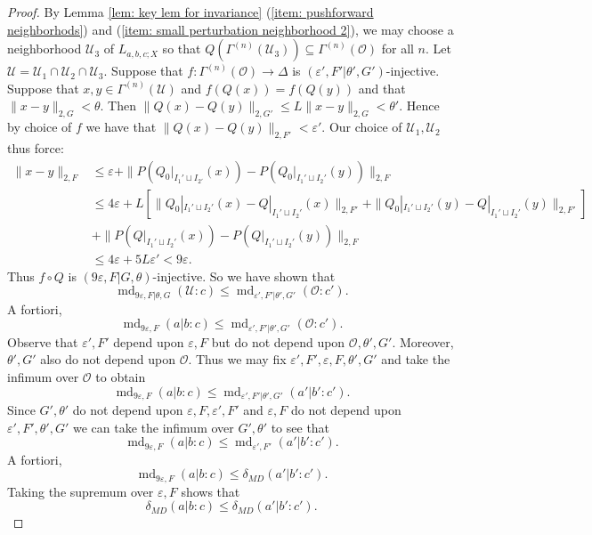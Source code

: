 \documentclass[10pt,a4paper]{amsart}
\DeclareMathOperator{\md}{md}
\begin{document}
\begin{proof}
By Lemma \ref{lem: key lem for invariance} (\ref{item: pushforward neighborhods}) and  (\ref{item: small perturbation neighborhood 2}), we may choose a neighborhood $\mathcal{U}_{3}$ of $L_{a,b,c;X}$ so that $Q(\Gamma^{(n)}(\mathcal{U}_{3}))\subseteq \Gamma^{(n)}(\mathcal{O})$ for all $n$. Let $\mathcal{U}=\mathcal{U}_{1}\cap \mathcal{U}_{2}\cap \mathcal{U}_{3}$. 
Suppose that $f\colon \Gamma^{(n)}(\mathcal{O})\to \Delta$ is $(\varepsilon',F'|\theta',G')$-injective. 
Suppose that $x,y\in \Gamma^{(n)}(\mathcal{U})$ and $f(Q(x))=f(Q(y))$ and that $\|x-y\|_{2,G}<\theta$. Then $\|Q(x)-Q(y)\|_{2,G'}\leq L\|x-y\|_{2,G}<\theta'$. Hence by choice of $f$ we have that $\|Q(x)-Q(y)\|_{2,F'}<\varepsilon'$. Our choice of $\mathcal{U}_{1},\mathcal{U}_{2}$ thus force:
\begin{align*}
\|x-y\|_{2,F}&\leq \varepsilon+\|P(Q_{0}|_{I_{1}'\sqcup I_{2'}}(x))-P(Q_{0}|_{I_{1}'\sqcup I_{2}'}(y))\|_{2,F}\\
&\leq 4\varepsilon+L\left[\|Q_{0}|_{I_{1}'\sqcup I_{2}'}(x)-Q|_{I_{1}'\sqcup I_{2}'}(x)\|_{2,F'}+\|Q_{0}|_{I_{1}'\sqcup I_{2}'}(y)-Q|_{I_{1}'\sqcup I_{2}'}(y)\|_{2,F'} \right]\\
&+\|P(Q|_{I_{1}'\sqcup I_{2}'}(x))-P(Q|_{I_{1}'\sqcup I_{2}'}(y))\|_{2,F}\\
&\leq 4\varepsilon+5L\varepsilon'<9\varepsilon.    
\end{align*}
Thus $f\circ Q$ is $(9\varepsilon,F|G,\theta)$-injective. So we have shown that 
\[\md_{9\varepsilon,F|\theta,G}(\mathcal{U}:c)\leq \md_{\varepsilon',F'|\theta',G'}(\mathcal{O}:c').\]
A fortiori,
\[\md_{9\varepsilon,F}(a|b:c)\leq \md_{\varepsilon',F'|\theta',G'}(\mathcal{O}:c').\]
Observe that $\varepsilon',F'$ depend upon $\varepsilon,F$ but do not depend upon $\mathcal{O},\theta',G'$. Moreover, $\theta',G'$ also do not depend upon $\mathcal{O}$. Thus we may fix $\varepsilon',F',\varepsilon,F,\theta',G'$ and take the infimum over $\mathcal{O}$ to obtain
\[\md_{9\varepsilon,F}(a|b:c)\leq \md_{\varepsilon',F'|\theta',G'}(a'|b':c').\]
Since $G',\theta'$ do not depend upon $\varepsilon,F,\varepsilon',F'$ and $\varepsilon,F$ do not depend upon $\varepsilon',F',\theta',G'$ we can take the infimum over $G',\theta'$ to see  that
\[\md_{9\varepsilon,F}(a|b:c)\leq \md_{\varepsilon',F'}(a'|b':c').\]
A fortiori,
\[\md_{9\varepsilon,F}(a|b:c)\leq \delta_{MD}(a'|b':c').\]
Taking the supremum over $\varepsilon,F$ shows that 
\[\delta_{MD}(a|b:c)\leq \delta_{MD}(a'|b':c').\]






\end{proof}
\end{document}
